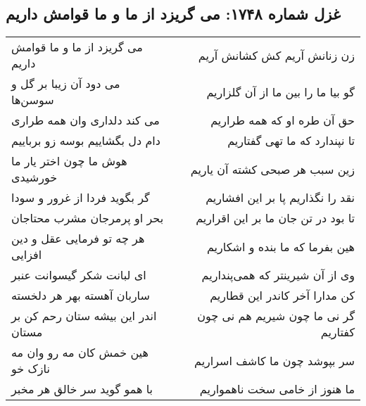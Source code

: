 \begin{center}
\section*{غزل شماره ۱۷۴۸: می گریزد از ما و ما قوامش داریم}
\label{sec:1748}
\begin{longtable}{l p{0.5cm} r}
می گریزد از ما و ما قوامش داریم
&&
زن زنانش آریم کش کشانش آریم
\\
می دود آن زیبا بر گل و سوسن‌ها
&&
گو بیا ما را بین ما از آن گلزاریم
\\
می کند دلداری وان همه طراری
&&
حق آن طره او که همه طراریم
\\
دام دل بگشاییم بوسه زو برباییم
&&
تا نپندارد که ما تهی گفتاریم
\\
هوش ما چون اختر یار ما خورشیدی
&&
زین سبب هر صبحی کشته آن یاریم
\\
گر بگوید فردا از غرور و سودا
&&
نقد را نگذاریم پا بر این افشاریم
\\
بحر او پرمرجان مشرب محتاجان
&&
تا بود در تن جان ما بر این اقراریم
\\
هر چه تو فرمایی عقل و دین افزایی
&&
هین بفرما که ما بنده و اشکاریم
\\
ای لبانت شکر گیسوانت عنبر
&&
وی از آن شیرینتر که همی‌پنداریم
\\
ساربان آهسته بهر هر دلخسته
&&
کن مدارا آخر کاندر این قطاریم
\\
اندر این بیشه ستان رحم کن بر مستان
&&
گر نی ما چون شیریم هم نی چون کفتاریم
\\
هین خمش کان مه رو وان مه نازک خو
&&
سر بپوشد چون ما کاشف اسراریم
\\
با همو گوید سر خالق هر مخبر
&&
ما هنوز از خامی سخت ناهمواریم
\\
\end{longtable}
\end{center}
